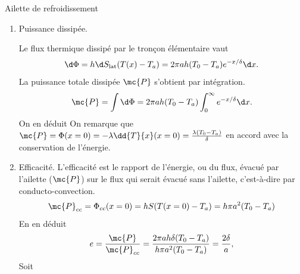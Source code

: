 \begin{exo}[PC][3][TD]{Ailette de refroidissement}
{\begin{enumerate}
La solution est de la forme $T(x) = T_a + A e^{-x/\delta} + B e^{x/\delta}$. Dans l'hypothèse où la longueur $L$ de la tige est $L\ll \delta$, on peut la supposer semi-infinie. Alors $B=0$ pour éviter que $T$ ne diverge. Puis le thermostat impose $T(x=0) = A +T_a = T_0$. En conclusion,

\item Puissance dissipée.

Le flux thermique dissipé par le tronçon élémentaire vaut
$$
\d \Phi = h \d S_{\rm lat} (T(x)-T_a) =  2\pi a h (T_0-T_a)  e^{-x/\delta} \d x .
$$
La puissance totale dissipée $\mc{P}$ s'obtient par intégration.
$$
\mc{P} = \int \d \Phi = 2\pi a h (T_0-T_a) \int_0^\infty e^{-x/\delta} \d x . %
$$
On en déduit
On remarque que $\mc{P} = \Phi(x=0) = -\lambda \dd{T}{x}(x=0) = \frac{\lambda(T_0-T_a)}{\delta}$ en accord avec la conservation de l'énergie.
\item Efficacité. L'efficacité est le rapport de l'énergie, ou du flux, évacué par l'ailette ($\mc{P}$) sur le flux qui serait évacué sans l'ailette, c'est-à-dire par conducto-convection.
$$
\mc{P}_{\rm cc} = \Phi_{cc}(x=0) = h S (T(x=0)-T_a) = h \pi a^2 (T_0-T_a)
$$
En en déduit
$$
e = \frac{\mc{P}}{\mc{P}_{cc}} = \frac{2\pi a h \delta (T_0-T_a) }{h \pi a^2 (T_0-T_a)} = \frac{2 \delta}{a},
$$
Soit
\end{enumerate}

}
\end{exo}

